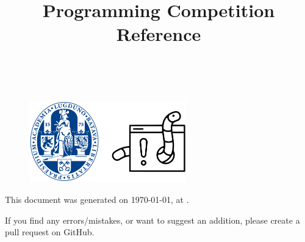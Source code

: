 \documentclass[dvipsnames]{article}
\title{Programming Competition Reference}
\begin{document}

\setlength{\abovedisplayskip}{0pt}
\setlength{\belowdisplayskip}{0pt}
\setlength{\abovedisplayshortskip}{0pt}
\setlength{\belowdisplayshortskip}{0pt}


\setlength{\columnseprule}{1pt}
\setlength{\columnsep}{0.5cm}
\def\columnseprulecolor{\color{gray}}

\begin{multicols}{2}

{\hspace{1pt}}


\begin{center}

    {\bfseries \fontsize{19}{23}\selectfont \doctitle}
    
    \vspace{0pt}
    
    \textsl{\small \authorname \\ \teamname}

    \begin{figure}[H]
    \centering
    \includegraphics[height=100pt]{logo.png}
    \label{fig:logo}
\end{figure}
\end{center}


\makeatletter
\renewcommand\tableofcontents{
    \@starttoc{toc}
}
\makeatother
{}
\setcounter{tocdepth}{2}
{\tableofcontents}




\end{multicols}


{\color{gray}\centering

This document was generated on \today, at \currenttime.

If you find any errors/mistakes, or want to suggest an addition, please create a pull request on GitHub.

}

\label{LastPage}
\end{document}
